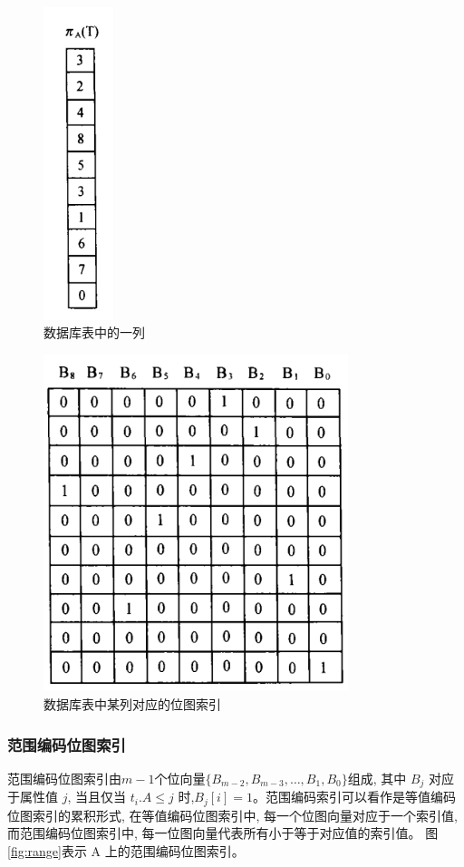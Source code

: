 \documentclass[11pt, a4paper]{article}
\begin{document}
  \begin{figure}[H]
    \centering
      \includegraphics[width=0.8in]{column.png}
      \caption{数据库表中的一列}\label{fig:column}
  \end{figure}


  \begin{figure}[H]
    \centering
      \includegraphics[width=3.5in]{bitmap.png}
      \caption{数据库表中某列对应的位图索引}\label{fig:bitmap}
  \end{figure}


  \subsubsection{范围编码位图索引}
  范围编码位图索引由$m-1$个位向量$\{B_{m-2}, B_{m-3}, \ldots, B_1,  B_0\}$组成, 其中 $B_j$ 对应于属性值 $j$, 当且仅当 $t_i.A \le j$ 时,$B_j[i] =1$。范围编码索引可以看作是等值编码位图索引的累积形式, 在等值编码位图索引中, 每一个位图向量对应于一个索引值, 而范围编码位图索引中, 每一位图向量代表所有小于等于对应值的索引值。 图\ref{fig:range}表示 A 上的范围编码位图索引。
\end{document}
